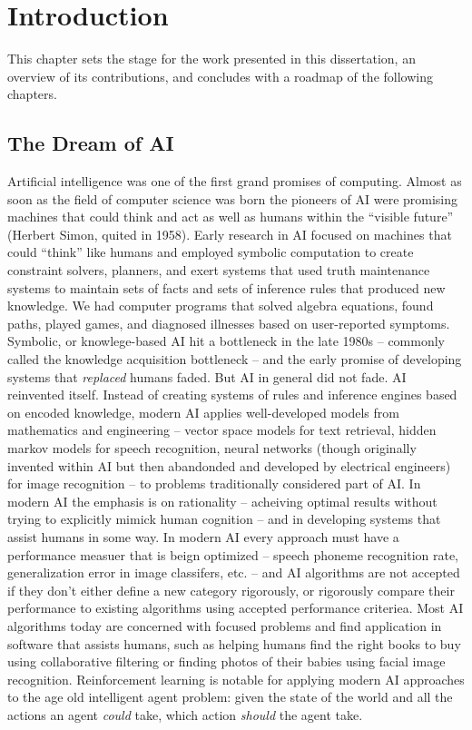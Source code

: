 \chapter{Introduction}

This chapter sets the stage for the work presented in this dissertation, an overview of its contributions, and concludes with a roadmap of the following chapters.

\section{The Dream of AI}

Artificial intelligence was one of the first grand promises of computing. Almost as soon as the field of computer science was born the pioneers of AI were promising machines that could think and act as well as humans within the ``visible future'' (Herbert Simon, quited in 1958). Early research in AI focused on machines that could ``think'' like humans and employed symbolic computation to create constraint solvers, planners, and exert systems that used truth maintenance systems to maintain sets of facts and sets of inference rules that produced new knowledge. We had computer programs that solved algebra equations, found paths, played games, and diagnosed illnesses based on user-reported symptoms. Symbolic, or knowlege-based AI hit a bottleneck in the late 1980s -- commonly called the knowledge acquisition bottleneck -- and the early promise of developing systems that {\it replaced} humans faded. But AI in general did not fade. AI reinvented itself. Instead of creating systems of rules and inference engines based on encoded knowledge, modern AI applies well-developed models from mathematics and engineering -- vector space models for text retrieval, hidden markov models for speech recognition, neural networks (though originally invented within AI but then abandonded and developed by electrical engineers) for image recognition -- to problems traditionally considered part of AI. In modern AI the emphasis is on rationality -- acheiving optimal results without trying to explicitly mimick human cognition -- and in developing systems that assist humans in some way. In modern AI every approach must have a performance measuer that is beign optimized -- speech phoneme recognition rate, generalization error in image classifers, etc. -- and AI algorithms are not accepted if they don't either define a new category rigorously, or rigorously compare their performance to existing algorithms using accepted performance criteriea. Most AI algorithms today are concerned with focused problems and find application in software that assists humans, such as helping humans find the right books to buy using collaborative filtering or finding photos of their babies using facial image recognition.  Reinforcement learning is notable for applying modern AI approaches to the age old intelligent agent problem: given the state of the world and all the actions an agent {\it could} take, which action {\it should} the agent take.


